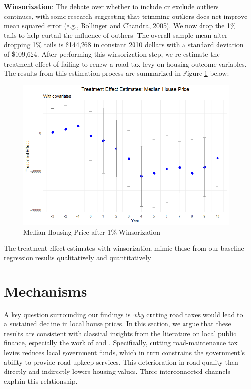 \textbf{Winsorization}: The debate over whether to include or exclude outliers continues, with some research suggesting that trimming outliers does not improve mean squared error (e.g., Bollinger and Chandra, 2005).  We now drop the 1\% tails to help curtail the influence of outliers. The overall sample mean after dropping 1\% tails is \$144,268 in constant 2010 dollars with a standard deviation of \$109,624. After performing this winsorization step, we re-estimate the treatment effect of failing to renew a road tax levy on housing outcome variables. The results from this estimation process are summarized in Figure \ref{fig:tes_g_w} below:

\begin{figure}[htbp]
    \centering
    \includegraphics[width=\textwidth,keepaspectratio]{images/tes_g_w_reg.png}    
    \caption{Median Housing Price after 1\% Winsorization}
    \label{fig:tes_g_w}
\end{figure}

The treatment effect estimates with winsorization mimic those from our baseline regression results qualitatively and quantitatively.

\section{Mechanisms} \label{sec:mech}

A key question surrounding our findings is \textit{why} cutting road taxes would lead to a sustained decline in local house prices. In this section, we argue that these results are consistent with classical insights from the literature on local public finance, especially the work of \cite{Tiebout1956} and \cite{Oates1972}. Specifically, cutting road-maintenance tax levies reduces local government funds, which in turn constrains the government’s ability to provide road-upkeep services. This deterioration in road quality then directly and indirectly lowers housing values. Three interconnected channels explain this relationship.

